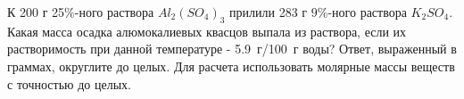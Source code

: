 
К 200 г 25$\%$-ного раствора $Al_2(SO_4)_3$ прилили 283 г $9\%$-ного раствора $K_2SO_4$. Какая масса осадка алюмокалиевых квасцов 
выпала из раствора, если их растворимость при данной температуре - 5.9~г/100~г воды? Ответ, выраженный в граммах, округлите до целых. Для расчета использовать молярные массы веществ с точностью до целых.




